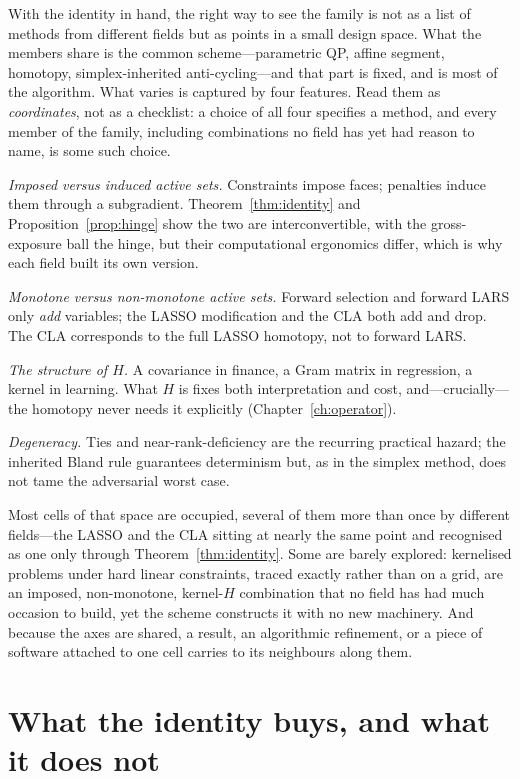 With the identity in hand, the right way to see the family is not as a list of
methods from different fields but as points in a small design space. What the members
share is the common scheme---parametric QP, affine segment, homotopy, simplex-inherited
anti-cycling---and that part is fixed, and is most of the algorithm. What varies is
captured by four features. Read them as \emph{coordinates}, not as a checklist: a
choice of all four specifies a method, and every member of the family, including
combinations no field has yet had reason to name, is some such choice.

\emph{Imposed versus induced active sets.} Constraints impose faces; penalties induce
them through a subgradient. Theorem~\ref{thm:identity} and
Proposition~\ref{prop:hinge} show the two are interconvertible, with the
gross-exposure ball the hinge, but their computational ergonomics differ, which is
why each field built its own version.

\emph{Monotone versus non-monotone active sets.} Forward selection and forward LARS
only \emph{add} variables; the LASSO modification and the CLA both add and drop.
The CLA corresponds to the full LASSO homotopy, not to forward LARS.

\emph{The structure of $H$.} A covariance in finance, a Gram matrix in regression, a
kernel in learning. What $H$ is fixes both interpretation and cost, and---crucially---
the homotopy never needs it explicitly (Chapter~\ref{ch:operator}).

\emph{Degeneracy.} Ties and near-rank-deficiency are the recurring practical hazard;
the inherited Bland rule guarantees determinism but, as in the simplex method, does
not tame the adversarial worst case.

Most cells of that space are occupied, several of them more than once by different
fields---the LASSO and the CLA sitting at nearly the same point and recognised as one
only through Theorem~\ref{thm:identity}. Some are barely explored: kernelised problems
under hard linear constraints, traced exactly rather than on a grid, are an imposed,
non-monotone, kernel-$H$ combination that no field has had much occasion to build, yet
the scheme constructs it with no new machinery. And because the axes are shared, a
result, an algorithmic refinement, or a piece of software attached to one cell carries
to its neighbours along them.

\section{What the identity buys, and what it does not}
\label{sec:transfer}


